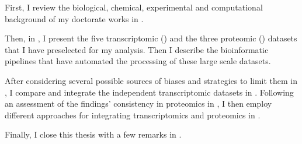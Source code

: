 First, I review the biological, chemical, experimental and computational
background of my doctorate works in .\mybr\

Then, in ,
I present the five transcriptomic (\Rnaseq)
and the three proteomic () datasets
that I have preselected for my analysis.
Then I describe the bioinformatic pipelines
that have automated the processing of these large scale datasets.\mybr\

After considering several possible sources of biases
and strategies to limit them in ,
I compare and integrate the independent transcriptomic datasets
in .
Following an assessment of the findings' consistency in proteomics
in ,
I then employ different approaches for integrating
transcriptomics and proteomics in .\mybr\

Finally, I close this thesis with a few remarks in .\mybr\

